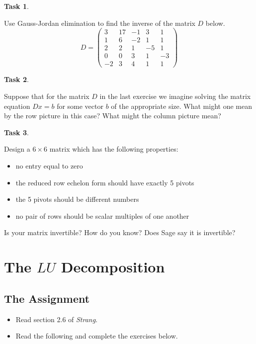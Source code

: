 \documentclass[10pt,]{book}
\theoremstyle{plain}
\theoremstyle{definition}
\numberwithin{equation}{section}
\newtheorem{task}{Task}[chapter]
\begin{document}
\begin{task}
\label{task-66}

        Use Gauss-Jordan elimination to find the inverse of the matrix \(D\) below.
        \[
        D = \begin{pmatrix}
        3 & 17 & -1 & 3 & 1 \\ 1 & 6 & -2 & 1 & 1 \\
        2 & 2 & 1 & -5 & 1 \\ 0 & 0 & 3 & 1 & -3 \\
        -2 & 3 & 4 & 1 & 1
        \end{pmatrix}
        \]\end{task}
\begin{task}
\label{task-67}

        Suppose that for the matrix \(D\) in the last exercise we imagine solving the matrix
        equation \(Dx = b\) for some vector \(b\) of the appropriate size. What might one mean
        by the row picture in this case? What might the column picture mean?
      \end{task}
\begin{task}
\label{task-68}

        Design a \(6 \times 6\) matrix which has the following properties:
        \begin{itemize}
\item{} no entry equal to zero\item{} the reduced row echelon form should have exactly 5 pivots\item{} the 5 pivots should be different numbers\item{} no pair of rows should be scalar multiples of one another\end{itemize}

        Is your matrix invertible? How do you know? Does Sage say it is invertible?
      \end{task}
\clearpage
\typeout{************************************************}
\typeout{************************************************}
\section[The \(LU\) Decomposition]{The \(LU\) Decomposition}\label{lu-decomposition}
\typeout{************************************************}
\typeout{************************************************}
\subsection[The Assignment]{The Assignment}\label{subsection-46}
\begin{itemize}
\item{}Read section 2.6 of \emph{Strang}.\item{}Read the following and complete the exercises below.\end{itemize}
\typeout{************************************************}
\typeout{************************************************}
\end{document}
